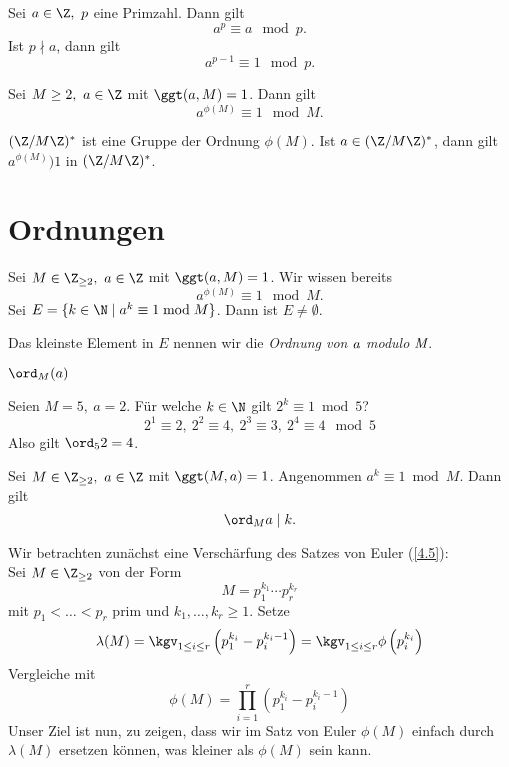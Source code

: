 \begin{thm}\autolabel
	Sei $a \in \Z,\ p $ eine Primzahl. Dann gilt
	\[ a^p \equiv a \mod p. \]
	Ist $p \nmid a$, dann gilt
	\[ a^{p-1} \equiv 1 \mod p. \]
\end{thm}

\begin{thm}[Euler]\autolabel
	Sei $M \geq 2,\ a \in \Z$ mit $\ggt(a,M) = 1$. Dann gilt
	\[ a^{\phi(M)} \equiv 1 \mod M. \]
\end{thm}

\begin{rem*}
	$(\Z/M\Z)^*$ ist eine Gruppe der Ordnung $\phi(M)$. Ist $a \in (\Z/M\Z)^*$, dann gilt $a^{\phi(M)} ) 1$ in $(\Z/M\Z)^*$.
\end{rem*}

\section{Ordnungen}

Sei $M \in \Z_{\geq 2},\ a \in \Z$ mit $\ggt(a,M)=1$. Wir wissen bereits 
\[ a^{\phi(M)} \equiv 1 \mod M. \]
Sei $E = \{k \in \N \mid a^k \equiv 1 \bmod M\}$. Dann ist $E \neq \emptyset$.

\begin{defn*}[Ordnung]
	Das kleinste Element in $E$ nennen wir die \emph{Ordnung von $\emph{a}$ modulo $\emph{M}$}.
	\begin{notat*}
		$\ord_M(a)$
	\end{notat*}
\end{defn*}

\begin{exmp*}
	Seien $M = 5,\ a= 2$. Für welche $k \in \N$ gilt $2^k \equiv 1 \bmod 5$?
	\[ 2^1 \equiv 2,\ 2^2 \equiv 4,\ 2^3 \equiv 3,\ 2^4 \equiv 4 \mod 5 \]
	Also gilt $\ord_5 2 = 4$.
\end{exmp*}

\begin{lem}\autolabel
	Sei $M \in \Z_{\geq 2},\ a \in \Z$ mit $\ggt(M,a)=1$. Angenommen $a^k \equiv 1 \bmod M$. Dann gilt
	\[ \ord_M a \mid k. \]
\end{lem}

\video Wir betrachten zunächst eine Verschärfung des Satzes von Euler (\ref{4.5}):\\
Sei $M \in \Z_{\geq 2}$ von der Form
\[ M = p_1^{k_1} \dotsm p_r^{k_r} \]
mit $p_1 < \dots < p_r$ prim und $k_1, \dotsc, k_r \geq 1$. Setze
\[ \lambda(M) = \kgv_{1 \leq i \leq r} \left( p_1^{k_i} - p_i^{k_i - 1} \right) = \kgv_{1 \leq i \leq r} \phi\left(p_i^{k_i}\right) \]
Vergleiche mit
\[ \phi(M) = \prod_{i=1}^r \left( p_1^{k_i} - p_i^{k_i - 1} \right) \]
Unser Ziel ist nun, zu zeigen, dass wir im Satz von Euler $\phi(M)$ einfach durch $\lambda(M)$ ersetzen können, was kleiner als $\phi(M)$ sein kann.

